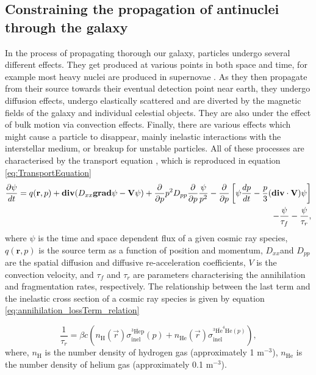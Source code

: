 \subsection{Constraining the propagation of antinuclei through the galaxy}\label{sec:Propagation}
In the process of propagating thorough our galaxy, particles undergo several different effects. They get produced at various points in both space and time, for example most heavy nuclei are produced in supernovae \cite{Supernovae_nucleosynthesis}. As they then propagate from their source towards their eventual detection point near earth, they undergo diffusion effects, undergo elastically scattered and are diverted by the magnetic fields of the galaxy and individual celestial objects. They are also under the effect of bulk motion via convection effects. Finally, there are various effects which might cause a particle to disappear, mainly inelastic interactions with the interstellar medium, or breakup for unstable particles. All of these processes are characterised by the transport equation \cite{Galprop_propagation}, which is reproduced in equation \ref{eq:TransportEquation}
\begin{equation}
    \label{eq:TransportEquation}
    \centering
    \begin{split}
        \frac{\partial\psi}{dt} = q(\textbf{r},p) 
        + \mathrm{\textbf{div}}(D_{xx}\mathrm{\textbf{grad}}\psi - \textbf{V}\psi) + \frac{\partial}{\partial p}p^2D_{pp} \frac{\partial}{\partial p}\frac{\psi}{p^2} - \frac{\partial}{\partial p} \left[ \psi \frac{dp}{d t}   -\frac{p}{3} (\mathrm{\textbf{div}}\cdot  \mathrm{\textbf{V}} )\psi              \right] \\ 
        - \frac{\psi}{\tau_f}-\frac{\psi}{\tau_r},
    \end{split}
\end{equation}
where $\psi$ is the time and space dependent flux of a given cosmic ray species, $q(\textbf{r},p)$ is the source term as a function of position and momentum, $D_{xx}$and $D_{pp}$ are the spatial diffusion and diffusive re-acceleration coefficients, $V$ is the convection velocity, and $\tau_f$ and $\tau_r$ are parameters characterising the annihilation and fragmentation rates, respectively. The relationship between the last term and the inelastic cross section of a cosmic ray species is given by equation \ref{eq:annihilation_lossTerm_relation}

\begin{equation}\label{eq:annihilation_lossTerm_relation}
    \frac{1}{\tau_r} = \beta c \left( n_\mathrm{H}(\vec{r})\sigma_{\mathrm{inel}}^{^3\mathrm{\overline{He}p}} (p) + n_{\mathrm{He}}(\vec{r})\sigma_{\mathrm{inel}}^{^3\mathrm{\overline{He}^4He} (p)} 
    \right),
\end{equation}
where, $n_\mathrm{H}$ is the number density of hydrogen gas (approximately 1 m$^{-3}$), $n_\mathrm{He}$ is the number density of helium gas (approximately 0.1 m$^{-3}$). \\%

